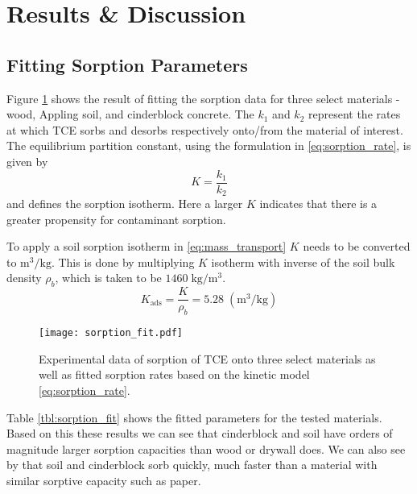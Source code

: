 \section{Results \& Discussion}\label{sec:results}

\subsection{Fitting Sorption Parameters}\label{sec:results_sorption_fit}
Figure \ref{fig:sorption_fit} shows the result of fitting the sorption data for three select materials - wood, Appling soil, and cinderblock concrete.
The $k_1$ and $k_2$ represent the rates at which TCE sorbs and desorbs respectively onto/from the material of interest.
The equilibrium partition constant, using the formulation in \eqref{eq:sorption_rate}, is given by
\begin{equation}
  K = \frac{k_1}{k_2}
\end{equation}
and defines the sorption isotherm.
Here a larger $K$ indicates that there is a greater propensity for contaminant sorption.\par

To apply a soil sorption isotherm in \eqref{eq:mass_transport} $K$ needs to be converted to $\mathrm{m^3/kg}$.
This is done by multiplying $K$ isotherm with inverse of the soil bulk density $\rho_b$, which is taken to be $1460 \; \mathrm{kg/m^3}$\cite{u.s._environmental_protection_agency_userss_2004}.
\begin{equation}
  K_\mathrm{ads} = \frac{K}{\rho_b} = 5.28 \; \mathrm{(m^3/kg)}
\end{equation}

\begin{figure}[htb!]
  \texttt{[image: sorption\_fit.pdf]}
  \caption{Experimental data of sorption of TCE onto three select materials as well as fitted sorption rates based on the kinetic model \eqref{eq:sorption_rate}.}
  \label{fig:sorption_fit}
\end{figure}

Table \ref{tbl:sorption_fit} shows the fitted parameters for the tested materials.
Based on this these results we can see that cinderblock and soil have orders of magnitude larger sorption capacities than wood or drywall does.
We can also see by that soil and cinderblock sorb quickly, much faster than a material with similar sorptive capacity such as paper.\par

